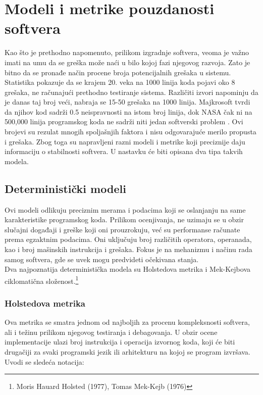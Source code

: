 \documentclass[a4paper]{article}
\begin{document}
\section{Modeli i metrike pouzdanosti softvera}	
\label{sec:modeli_metrike}

Kao što je prethodno napomenuto, prilikom izgradnje softvera, veoma je važno imati na umu da se greška može naći u bilo kojoj fazi njegovog razvoja. Zato je bitno da se pronađe način procene broja potencijalnih grešaka u sistemu.\\
Statistika pokazuje da se krajem 20. veka na 1000 linija koda pojavi oko 8 grešaka, ne računajući prethodno testiranje sistema. Različiti izvori napominju da je danas taj broj veći, nabraja se 15-50 grešaka na 1000 linija. Majkrosoft tvrdi da njihov kod sadrži 0.5 neispravnosti na istom broj linija, dok NASA čak ni na 500,000 linija programskog koda ne sadrži niti jedan softverski problem \cite{Statistika_prosek_gresaka}. Ovi brojevi su rezulat mnogih spoljašnjih faktora i nisu odgovarajuće merilo propusta i grešaka. Zbog toga su napravljeni razni modeli i metrike koji preciznije daju informaciju o stabilnosti softvera. U nastavku će biti opisana dva tipa takvih modela.\\


\subsection{Deterministički modeli}
\label{sec:deterministicki}

Ovi modeli odlikuju preciznim merama i podacima koji se oslanjanju na same karakteristike programskog koda. Prilikom ocenjivanja, ne uzimaju se u obzir slučajni događaji i greške koji oni prouzrokuju, već su performanse računate prema egzaktnim podacima. Oni uključuju broj različitih operatora, operanada, kao i broj mašinskih instrukcija i grešaka. Fokus je na mehanizmu i načinu rada samog softvera, gde se uvek mogu predvideti očekivana stanja.\\
Dva najpoznatija deterministička modela su Holstedova metrika i Mek-Kejbova ciklomatična složenost.\footnote{Moris Hauard Holsted (1977), Tomas Mek-Kejb (1976)}

\subsubsection{Holstedova metrika}
\label{subsec:holsted}

Ova metrika se smatra jednom od najboljih za procenu kompleksnosti softvera, ali i težinu prilikom njegovog testiranja i debagovanja. U obzir ocene implementacije ulazi broj instrukcija i operacija izvornog koda, koji će biti drugačiji za svaki programski jezik ili arhitekturu na kojoj se program izvršava. Uvodi se sledeća notacija:\\
\end{document}

